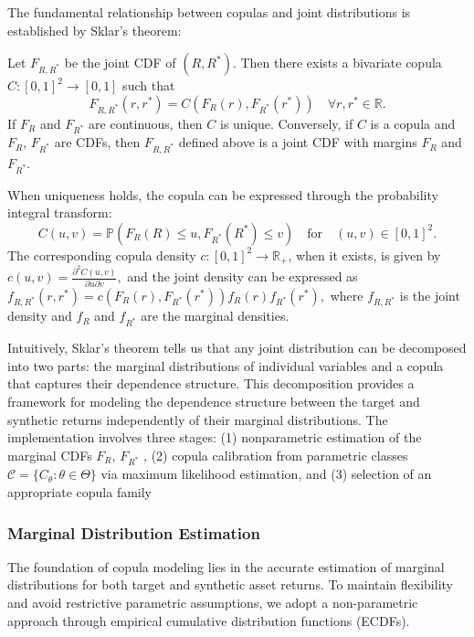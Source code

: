 The fundamental relationship between copulas and joint distributions is established by Sklar's theorem:

\begin{theorem}[Sklar (1959)]
Let $F_{R,R^*}$ be the joint CDF of $(R,R^*)$. Then there exists a bivariate copula $C: [0,1]^2 \to [0,1]$ such that
\begin{equation}
   F_{R,R^*}(r,r^*) = C(F_R(r), F_{R^*}(r^*)) \quad \forall r,r^* \in \mathbb{R}.
\end{equation}
If $F_R$ and $F_{R^*}$ are continuous, then $C$ is unique. Conversely, if $C$ is a copula and $F_R$, $F_{R^*}$ are CDFs, then $F_{R,R^*}$ defined above is a joint CDF with margins $F_R$ and $F_{R^*}$.
\end{theorem}
%
When uniqueness holds, the copula can be expressed through the probability integral transform: 
$$
C(u,v) = \mathbb P( F_R(R) \leq u, F_{R^*}(R^*) \leq v) 
\quad \text{for} \quad
(u,v)\in[0,1]^2
.
$$
The corresponding copula density $c:[0,1]^2\to\mathbb R_+$, when it exists, is given by
$
   c(u,v) = \frac{\partial^2 C(u,v)}{\partial u \partial v},
$
and the joint density can be expressed as
$
   f_{R,R^*}(r,r^*) = c(F_R(r), F_{R^*}(r^*)) f_R(r)f_{R^*}(r^*),
$
where $f_{R,R^*}$ is the joint density and $f_R$ and $f_{R^*}$ are the marginal densities.

Intuitively, Sklar's theorem tells us that any joint distribution can be decomposed into two parts: the marginal distributions of individual variables and a copula that captures their dependence structure. 
This decomposition provides a framework for modeling the dependence structure between the target and synthetic returns independently of their marginal distributions. The implementation involves three stages: (1) nonparametric estimation of the marginal CDFs $F_R$, $F_{R^*}$ , (2) copula calibration from parametric classes $\mathcal{C} = \{C_\theta : \theta \in \Theta\}$ via maximum likelihood estimation, and (3) selection of an appropriate copula family 



\subsubsection{Marginal Distribution Estimation}
The foundation of copula modeling lies in the accurate estimation of marginal distributions for both target and synthetic asset returns. To maintain flexibility and avoid restrictive parametric assumptions, we adopt a non-parametric approach through empirical cumulative distribution functions (ECDFs).

